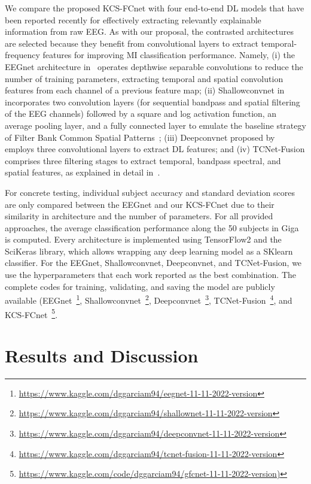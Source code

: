 	We compare the proposed KCS-FCnet with four end-to-end DL models that have been reported recently for effectively extracting relevantly explainable information from raw EEG. As with our proposal, the contrasted architectures are selected because they benefit from convolutional layers to extract temporal-frequency features for improving MI classification performance. Namely, (i) the EEGnet architecture in~\cite{lawhern2018eegnet} operates depthwise separable convolutions to reduce the number of training parameters, extracting temporal and spatial convolution features from each channel of a previous feature map; (ii) Shallowconvnet in~\cite{schirrmeister2017deep} incorporates two convolution layers (for sequential bandpass and spatial filtering of the EEG channels) followed by a square and log activation function, an average pooling layer, and a fully connected layer to emulate the baseline strategy of Filter Bank Common Spatial Patterns~\cite{ang2008filter}; (iii) Deepconvnet proposed by~\cite{schirrmeister2017deep} employs three convolutional layers to extract DL features; and (iv) TCNet-Fusion comprises three filtering stages to extract temporal, bandpass spectral, and spatial features, as explained in detail in~\cite{musallam2021electroencephalography}.
	
	For concrete testing, individual subject accuracy and standard deviation scores are only compared between the EEGnet and our KCS-FCnet due to their similarity in architecture and the number of parameters. For all provided approaches, the average classification performance along the 50 subjects in Giga is computed. Every architecture is implemented using TensorFlow2 and the SciKeras library, which allows wrapping any deep learning model as a SKlearn classifier. For the EEGnet, Shallowconvnet, Deepconvnet, and TCNet-Fusion, we use the hyperparameters that each work reported as the best combination. The complete codes for training, validating, and saving the model are publicly available (EEGnet~\footnote{\url{https://www.kaggle.com/dggarciam94/eegnet-11-11-2022-version}}, Shallowconvnet~\footnote{\url{https://www.kaggle.com/dggarciam94/shallownet-11-11-2022-version}}, Deepconvnet~\footnote{\url{https://www.kaggle.com/dggarciam94/deepconvnet-11-11-2022-version}}, TCNet-Fusion~\footnote{\url{https://www.kaggle.com/dggarciam94/tcnet-fusion-11-11-2022-version}}, and KCS-FCnet~\footnote{\url{https://www.kaggle.com/code/dggarciam94/gfcnet-11-11-2022-version)}}.

 \section{Results and Discussion}


